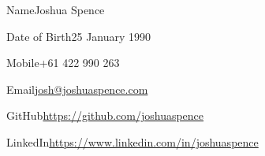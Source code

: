 \begin{personalDetails}
  \item{Name}{Joshua Spence}
  \item{Date of Birth}{25 January 1990}
  \item{Mobile}{+61 422 990 263\vspace{1em}}
  \item{Email}{\url{josh@joshuaspence.com}}
  \item{GitHub}{\url{https://github.com/joshuaspence}}
  \item{LinkedIn}{\url{https://www.linkedin.com/in/joshuaspence}}
\end{personalDetails}
